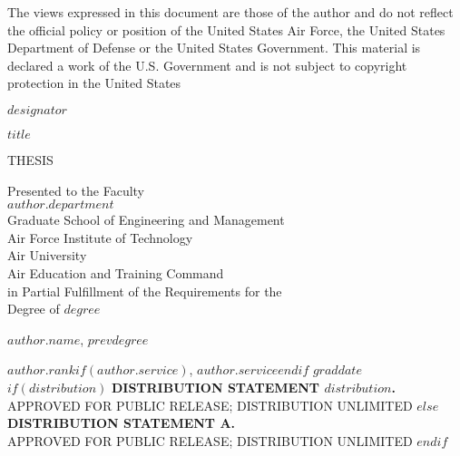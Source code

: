 \documentclass[12pt,letterpaper,toc=flat,oneside]{book}
\begin{document}
	\thispagestyle{empty}
	\singlespacing
	\null	
	\vfill 
	\noindent The views expressed in this document are those of the
author and do not reflect the official policy or position of the
United States Air Force, the United States Department of Defense or
the United States Government.  This material is declared a work of the
U.S. Government and is not subject to copyright protection in the
United States
	\vfill 
	\doublespacing
	\newpage
	\pagestyle{plain}
    \begin{titlepage}
	\thispagestyle{empty}
	\noindent $designator$  
	\vfill
	\begin{center}
	    \MakeUppercase{$title$}\par
	    \vskip 1cm
	    \MakeUppercase{thesis}\par
	    \vskip 1cm
	    Presented to the Faculty\\
	    $author.department$\\
	    Graduate School of Engineering and Management~\\
	    Air Force Institute of Technology~\\
	    Air University~\\
	    Air Education and Training Command~\\
	    in Partial Fulfillment of the Requirements for the~\\
	    Degree of $degree$\\
	    \vskip 1cm
	    {$author.name$, $prevdegree$\par}
	    {$author.rank$$if(author.service)$, \MakeUppercase{$author.service$}$endif$}
	    \vskip 1cm
	    $graddate$
	    \vskip 1cm
	    $if(distribution)$
	    \MakeUppercase{\textbf{distribution statement $distribution$.}}\\[-8pt]
	    \MakeUppercase{approved for public release; distribution unlimited}
	    $else$
	    \MakeUppercase{\textbf{distribution statement a.}}\\[-8pt]
	    \MakeUppercase{Approved for Public Release; distribution unlimited}
	    $endif$	    
	    \vfill
	\end{center}
	\newpage 
	\pagestyle{plain}
    \end{titlepage}
\end{document}

